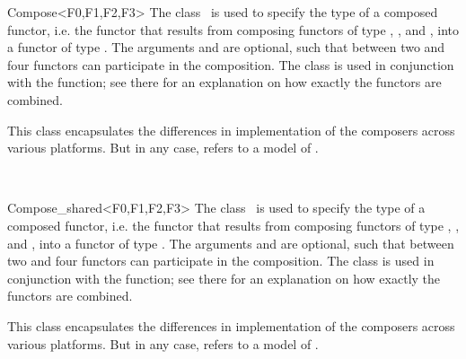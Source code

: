 \begin{ccRefClass}{Compose<F0,F1,F2,F3>}
  \ccDefinition The class \ccRefName\ is used to specify the type of a
  composed functor, i.e. the functor that results from composing
  functors of type , , and , into a functor of
  type . The arguments  and  are optional,
  such that between two and four functors can participate in the
  composition. The class is used in conjunction with the 
  function; see there for an explanation on how exactly the functors
  are combined.

  
  \ccTypes
  
   This class encapsulates the differences in
  implementation of the composers across various platforms. But in any
  case,  refers to a model of .

  \ccSeeAlso
  \\
  
\end{ccRefClass}

\begin{ccRefClass}{Compose_shared<F0,F1,F2,F3>}
  \ccDefinition The class \ccRefName\ is used to specify the type of a
  composed functor, i.e. the functor that results from composing
  functors of type , , and , into a functor of
  type . The arguments  and  are optional,
  such that between two and four functors can participate in the
  composition. The class is used in conjunction with the
   function; see there for an explanation on how
  exactly the functors are combined.

  
  \ccTypes
  
   This class encapsulates the differences in
  implementation of the composers across various platforms. But in any
  case,  refers to a model of .

  \ccSeeAlso
  \\
  
\end{ccRefClass}

